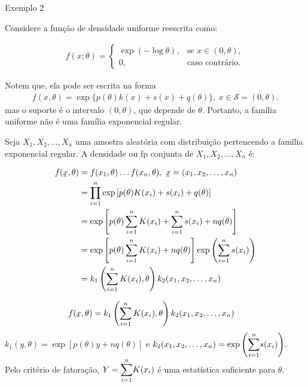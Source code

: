 \documentclass[12pt]{beamer}
\begin{document}
\begin{frame}{Exemplo 2}
\begin{block}{}
\justifying
Considere a função de densidade uniforme reescrita como:

\begin{align*}
f(x; \theta) =
\begin{cases}
\exp\left(-\log\theta\right), & \text{se } x \in (0, \theta), \\
0, & \text{caso contrário}.
\end{cases}
\end{align*}

Notem que, ela pode ser escrita na forma 
\begin{align*}
    f(x,\theta)=\exp{\{p(\theta)k(x)+s(x)+q(\theta)\}},~x\in \mathcal{S}=(0,\theta).
\end{align*}
mas o suporte é o intervalo $(0, \theta)$, que depende de $\theta$. Portanto, a família uniforme não é uma família exponencial regular.
\end{block}
\end{frame}

\begin{frame}{}
\begin{block}{}
\justifying
Seja $X_1, X_2, \ldots, X_n$ uma amostra aleatória com distribuição pertencendo a família exponencial regular. A densidade ou fp conjunta de $X_1, X_2, \ldots, X_n$ é:

\begin{align*}
f(\underaccent{\tilde}{x},\theta)&=f(x_{1},\theta)\ldots f(x_{n},\theta),~\underaccent{\tilde}{x}=(x_1, x_2, \ldots, x_n)\\
&=\Prodi \exp\left[p(\theta)K(x_i) + s(x_i) + q(\theta)\right]\\
&=\exp\left[p(\theta)\sum_{i=1}^{n}K(x_i) + \sum_{i=1}^{n}s(x_i) + nq(\theta)\right]\\
&=\exp\left[p(\theta)\sum_{i=1}^{n}K(x_i) + nq(\theta)\right]\exp{\left(\sum_{i=1}^{n}s(x_i)\right)}\\
&=k_{1}\left(\sum_{i=1}^{n}K(x_i),\theta\right)k_{2}(x_1, x_2, \ldots, x_n)
\end{align*}
\end{block}
\end{frame}

\begin{frame}{}
\begin{block}{}
\justifying
\begin{align*}
f(\underaccent{\tilde}{x},\theta)&=k_{1}\left(\sum_{i=1}^{n}K(x_i),\theta\right)k_{2}(x_1, x_2, \ldots, x_n)
\end{align*}
$k_{1}(y,\theta)=\exp{[p(\theta)y+nq(\theta)]}$ e $k_{2}(x_1, x_2, \ldots, x_n)=\exp{\left({\displaystyle \sum_{i=1}^{n}}s(x_i)\right)}.$ Pelo critério de fatoração, $Y={\displaystyle \sum_{i=1}^{n}} K(x_i)$ é uma estatística suficiente para $\theta.$
\end{block}
\end{frame}
\end{document}
